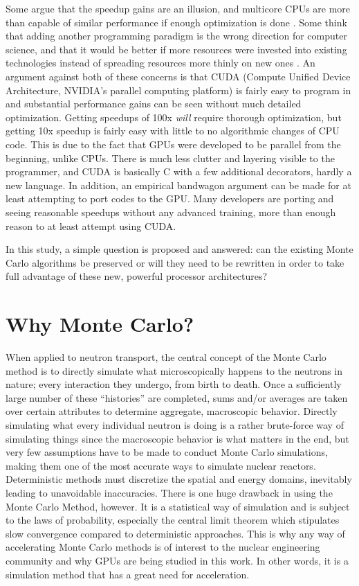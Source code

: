 Some argue that the speedup gains are an illusion, and multicore CPUs are more than capable of similar performance if enough optimization is done \cite{}. Some think that adding another programming paradigm is the wrong direction for computer science, and that it would be better if more resources were invested into existing technologies instead of spreading resources more thinly on new ones \cite{}.  An argument against both of these concerns is that CUDA (Compute Unified Device Architecture, NVIDIA's parallel computing platform) is fairly easy to program in and substantial performance gains can be seen without much detailed optimization.  Getting speedups of 100x \emph{will} require thorough optimization, but getting 10x speedup is fairly easy with little to no algorithmic changes of CPU code.  This is due to the fact that GPUs were developed to be parallel from the beginning, unlike CPUs.  There is much less clutter and layering visible to the programmer, and CUDA is basically C with a few additional decorators, hardly a new language.   In addition, an empirical  bandwagon argument can be made for at least attempting to port codes to the GPU.  Many developers are porting and seeing reasonable speedups without any advanced training, more than enough reason to at least attempt using CUDA. 

In this study, a simple question is proposed and answered: can the existing Monte Carlo algorithms be preserved or will they need to be rewritten in order to take full advantage of these new, powerful processor architectures?

\section{Why Monte Carlo?}

When applied to neutron transport, the central concept of the Monte Carlo method is to directly simulate what  microscopically happens to the neutrons in nature; every interaction they undergo, from birth to death.  Once a sufficiently large number of these ``histories'' are completed, sums and/or averages are taken over certain attributes to determine aggregate, macroscopic behavior.  Directly simulating what every individual neutron is doing is a rather brute-force way of simulating things since the macroscopic behavior is what matters in the end, but very few assumptions have to be made to conduct Monte Carlo simulations, making them one of the most accurate ways to simulate nuclear reactors.  Deterministic methods must discretize the spatial and energy domains, inevitably leading to unavoidable inaccuracies.  There is one huge drawback in using the Monte Carlo Method, however.  It is a statistical way of simulation and is subject to the laws of probability, especially the central limit theorem which stipulates slow convergence compared to deterministic approaches.  This is why any way of accelerating Monte Carlo methods is of interest to the nuclear engineering community and why GPUs are being studied in this work.  In other words, it is a simulation method that has a great need for acceleration. 

